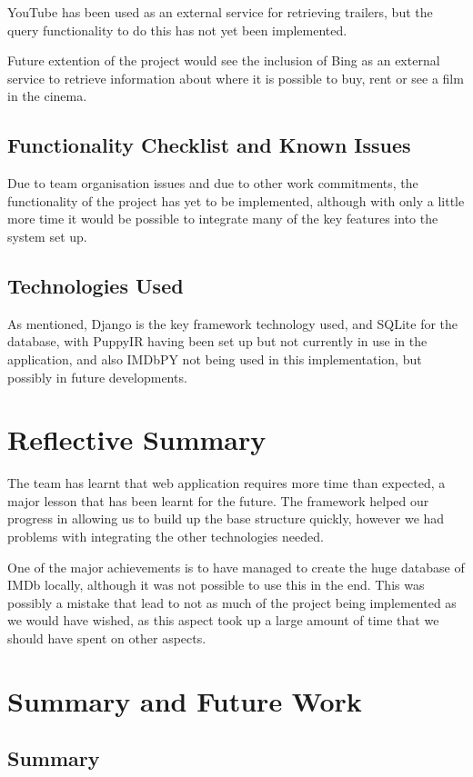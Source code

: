 \documentclass{sig-alt-release2}
\begin{document}
YouTube has been used as an external service for retrieving trailers, but the query functionality to do this has not yet been implemented.

Future extention of the project would see the inclusion of Bing as an external service to retrieve information about where it is possible to buy, rent or see a film in the cinema.

\subsection*{Functionality Checklist and Known Issues}
Due to team organisation issues and due to other work commitments, the functionality of the project has yet to be implemented, although with only a little more time it would be possible to integrate many of the key features into the system set up.

\subsection*{Technologies Used}
As mentioned, Django is the key framework technology used, and SQLite for the database, with PuppyIR having been set up but not currently in use in the application, and also IMDbPY not being used in this implementation, but possibly in future developments.


\section{Reflective Summary}
The team has learnt that web application requires more time than expected, a major lesson that has been learnt for the future. The framework helped our progress in allowing us to build up the base structure quickly, however we had problems with integrating the other technologies needed.

One of the major achievements is to have managed to create the huge database of IMDb locally, although it was not possible to use this in the end. This was possibly a mistake that lead to not as much of the project being implemented as we would have wished, as this aspect took up a large amount of time that we should have spent on other aspects.

\section{Summary and Future Work}
 
\subsection*{Summary}
 
\end{document}
